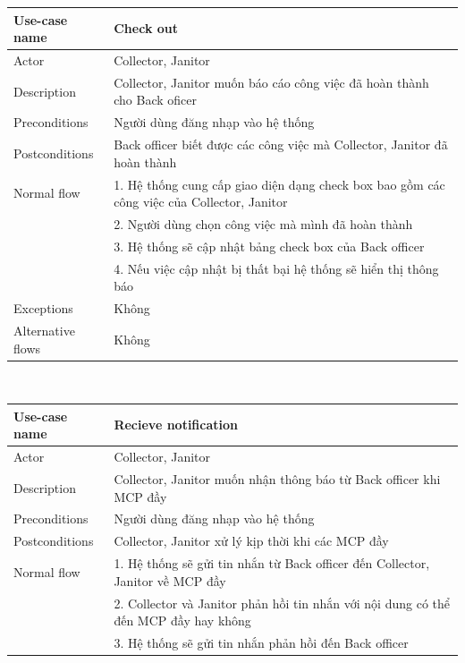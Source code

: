 \documentclass[a4paper]{article}
\begin{document}
\begin{enumerate}
 \begin{tabular}{| p{3cm} | p{10cm} |}
  \hline
     Use-case name & Check out
     \\
     \hline
     Actor & Collector, Janitor
     \\ \hline
     Description & Collector, Janitor muốn báo cáo công việc đã hoàn thành  cho Back oficer
      \\
     \hline
     Preconditions & Người dùng đăng nhạp vào hệ thống\\
          \hline
     Postconditions & Back officer biết được các công việc mà Collector, Janitor đã hoàn thành
     \\ \hline
      Normal flow & 1. Hệ thống cung cấp giao diện dạng check box bao gồm các công việc của Collector, Janitor \\

         & 2. Người dùng chọn công việc mà mình đã hoàn thành\\
        & 3. Hệ thống sẽ cập nhật bảng check box của Back officer\\
        & 4. Nếu việc cập nhật bị thất bại hệ thống sẽ hiển thị thông báo \\
      \hline
     Exceptions & Không 
     \\ \hline
     Alternative flows & Không
     \\ \hline
\end{tabular}\\
\vspace{0.5cm}

 \begin{tabular}{| p{3cm} | p{10cm} |}
  \hline
     Use-case name & Recieve notification
     \\
     \hline
     Actor & Collector, Janitor
     \\ \hline
     Description & Collector, Janitor muốn nhận thông báo từ Back officer khi MCP đầy
      \\
     \hline
     Preconditions & Người dùng đăng nhạp vào hệ thống\\
          \hline
     Postconditions & Collector, Janitor xử lý kịp thời khi các MCP đầy
     \\ \hline
      Normal flow & 1. Hệ thống sẽ gửi tin nhắn từ Back officer đến Collector, Janitor về MCP đầy  \\

         & 2.  Collector và Janitor phản hồi tin nhắn với nội dung có thể đến MCP đầy hay không\\
        & 3. Hệ thống sẽ gửi tin nhắn phản hồi đến Back officer\\
    

\end{tabular}
\end{enumerate}
\end{document}

